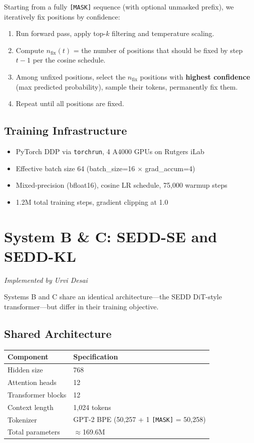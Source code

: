 \documentclass[11pt,a4paper]{article}
\begin{document}
Starting from a fully \texttt{[MASK]} sequence (with optional unmasked prefix), we iteratively fix positions by confidence:
\begin{enumerate}[nosep]
  \item Run forward pass, apply top-$k$ filtering and temperature scaling.
  \item Compute $n_\text{fix}(t)$ = the number of positions that should be fixed by step $t-1$ per the cosine schedule.
  \item Among unfixed positions, select the $n_\text{fix}$ positions with \textbf{highest confidence} (max predicted probability), sample their tokens, permanently fix them.
  \item Repeat until all positions are fixed.
\end{enumerate}

\subsection{Training Infrastructure}

\begin{itemize}[nosep]
  \item PyTorch DDP via \texttt{torchrun}, 4 A4000 GPUs on Rutgers iLab
  \item Effective batch size 64 (batch\_size=16 $\times$ grad\_accum=4)
  \item Mixed-precision (bfloat16), cosine LR schedule, 75,000 warmup steps
  \item 1.2M total training steps, gradient clipping at 1.0
\end{itemize}

\section{System B \& C: SEDD-SE and SEDD-KL}

\textit{Implemented by Urvi Desai}

Systems B and C share an identical architecture---the SEDD DiT-style transformer---but differ in their training objective.

\subsection{Shared Architecture}

\begin{center}
\begin{tabular}{ll}
\toprule
Component & Specification \\
\midrule
Hidden size & 768 \\
Attention heads & 12 \\
Transformer blocks & 12 \\
Context length & 1,024 tokens \\
Tokenizer & GPT-2 BPE (50,257 + 1 \texttt{[MASK]} = 50,258) \\
Total parameters & $\approx$169.6M \\
\bottomrule
\end{tabular}
\end{center}
\end{document}
